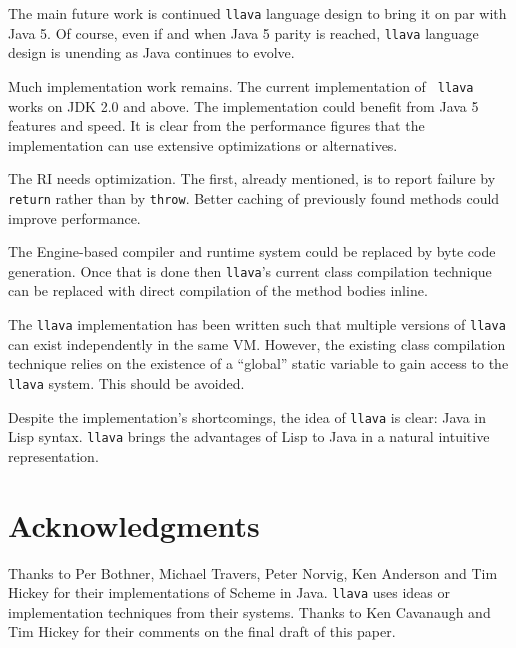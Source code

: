 \documentclass{acm-final/sig-alternate-modified}
\begin{document}
The main future work is continued {\tt llava} language design to bring
it on par with Java 5.  Of course, even if and when Java 5 parity is
reached, {\tt llava} language design is unending as Java continues to
evolve.

Much implementation work remains.  The current implementation of {\tt
llava} works on JDK 2.0 and above.  The implementation could benefit
from Java 5 features and speed.  It is clear from the performance
figures that the implementation can use extensive optimizations or
alternatives.

The RI needs optimization.  The first, already mentioned, is to report
failure by {\tt return} rather than by {\tt throw}.  Better caching of
previously found methods could improve performance.

The Engine-based compiler and runtime system could be replaced by byte
code generation.  Once that is done then {\tt llava}'s current class
compilation technique can be replaced with direct compilation of the
method bodies inline.  

The {\tt llava} implementation has been written such
that multiple versions of {\tt llava} can exist independently in the
same VM.  However, the existing class compilation technique relies on the
existence of a ``global'' static variable to gain access to the {\tt
llava} system.  This should be avoided.

Despite the implementation's shortcomings, the idea of {\tt llava} is
clear: Java in Lisp syntax.  {\tt llava} brings the advantages of Lisp
to Java in a natural intuitive representation.


\section{Acknowledgments}

Thanks to Per Bothner, Michael Travers, Peter Norvig, Ken Anderson and
Tim Hickey for their implementations of Scheme in Java.  {\tt llava}
uses ideas or implementation techniques from their systems.  Thanks to
Ken Cavanaugh and Tim Hickey for their comments on the final draft of
this paper.
\end{document}
